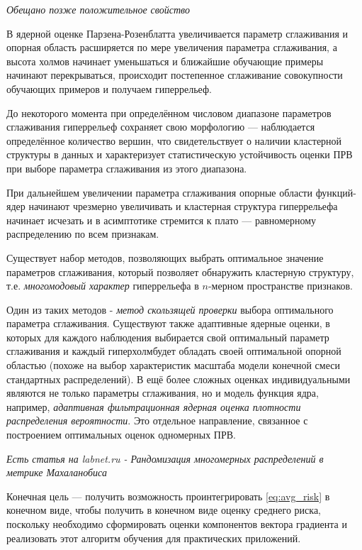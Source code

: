 \documentclass{article}
\numberwithin{equation}{subsection}
\begin{document}
\begin{myquote}
    \textit{Обещано позже положительное свойство}
\end{myquote}

В ядерной оценке Парзена-Розенблатта увеличивается параметр сглаживания и опорная область
расширяется по мере увеличения параметра сглаживания, а высота \glqq холмов\grqq
начинает уменьшаться и ближайшие обучающие примеры начинают перекрываться, происходит
постепенное сглаживание совокупности обучающих примеров и получаем \glqq гиперрельеф\grqq.

До некоторого момента при определённом числовом диапазоне параметров 
сглаживания гиперрельеф сохраняет свою морфологию --- наблюдается определённое количество
вершин, что свидетельствует о наличии кластерной структуры в данных и характеризует
статистическую устойчивость оценки ПРВ при выборе параметра сглаживания из этого диапазона.

При дальнейшем увеличении параметра сглаживания опорные области функций-ядер начинают
чрезмерно увеличивать и кластерная структура гиперрельефа начинает
исчезать и в асимптотике стремится к плато --- равномерному распределению 
по всем признакам.

Существует набор методов, позволяющих выбрать оптимальное значение параметров сглаживания,
который позволяет обнаружить кластерную структуру, т.е. \textit{многомодовый характер} 
гиперрельефа в $n$-мерном пространстве признаков.

Один из таких методов - \textit{метод скользящей проверки} выбора оптимального параметра
сглаживания. Существуют также адаптивные ядерные оценки, в которых для каждого наблюдения
выбирается свой оптимальный параметр сглаживания и каждый \glqq гиперхолм\grqq будет
обладать своей оптимальной опорной областью (похоже на выбор характеристик масштаба 
модели конечной смеси стандартных распределений).
В ещё более сложных оценках индивидуальными являются не только параметры сглаживания,
но и модель функция ядра, например, \textit{адаптивная фильтрационная ядерная оценка
плотности распределения вероятности}. Это отдельное направление, связанное с 
построением оптимальных оценок одномерных ПРВ.

\begin{myquote}
    \textit{Есть статья на labnet.ru - Рандомизация многомерных распределений в метрике
    Махаланобиса}
\end{myquote}

Конечная цель --- получить возможность проинтегрировать \ref{eq:avg_risk} в конечном 
виде, чтобы получить в конечном виде оценку среднего риска, поскольку
необходимо сформировать оценки компонентов вектора градиента и реализовать этот 
алгоритм обучения для практических приложений. 
\end{document}
